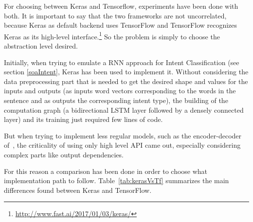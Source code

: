 For choosing between Keras and Tensorflow, experiments have been done with both. It is important to say that the two frameworks are not uncorrelated, because Keras as default backend uses TensorFlow and TensorFlow recognizes Keras as its high-level interface.\footnote{\url{http://www.fast.ai/2017/01/03/keras/}} So the problem is simply to choose the abstraction level desired.

Initially, when trying to emulate a RNN approach for Intent Classification (see section \ref{soaIntent}, Keras has been used to implement it. Without considering the data preprocessing part that is needed to get the desired shape and values for the inputs and outputs (as inputs word vectors corresponding to the words in the sentence and as outputs the corresponding intent type), the building of the computation graph (a bidirectional LSTM layer followed by a densely connected layer) and its training just required few lines of code.

But when trying to implement less regular models, such as the encoder-decoder of~\cite{liu2016attention}, the criticality of using only high level API came out, especially considering complex parts like output dependencies.

For this reason a comparison has been done in order to choose what implementation path to follow. Table~\ref{tab:kerasVsTf} summarizes the main differences found between Keras and TensorFlow.


